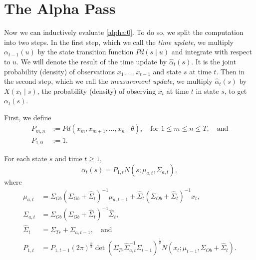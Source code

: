 \documentclass[12pt,leqno]{article}
\begin{document}
\section{The Alpha Pass}
  Now we can inductively evaluate \eqref{alpha:0}. To do so, we split the computation
  into two steps.  In the first step, which we call the {\em time update}, we multiply
  $\alpha_{t-1}(u)$ by the state transition function $Pd(s\mid u)$ and integrate with respect
  to $u$. We will denote the result of the time update by $\hat{\alpha}_t(s)$.  It is the joint probability
  (density) of observations $x_1,\dots,x_{t-1}$ and state $s$ at time $t$.
  Then in the second step, which we call the {\em measurement update}, we multiply
  $\hat{\alpha}_t(s)$ by $X(x_t \mid s)$, the probability (density) of observing $x_t$ at time $t$
  in state $s$, to get $\alpha_t(s)$.

  First, we define
\begin{align*}
  P_{m,n} &:= Pd(x_m,x_{m+1},\dots,x_n \mid \theta),\quad\text{for $1\le m \le n\le T$},\quad\text{and}\\
  P_{1,0} &:= 1.
\end{align*}
\begin{Thm}\label{alpha:1}
  For each state $s$ and time $t \ge 1$,
$$
  \alpha_t(s) = P_{1,t}N(s;\mu_{a,t},\Sigma_{a,t}),
$$
where
\begin{align*}
  \mu_{a,t} &= \Sigma_{Ob}(\Sigma_{Ob}+\widehat{\Sigma}_t)^{-1}\mu_{a,t-1}
  + \widehat{\Sigma}_t(\Sigma_{Ob}+\widehat{\Sigma}_t)^{-1}x_t, \\
  \Sigma_{a,t} &= \Sigma_{Ob}(\Sigma_{Ob}+\widehat{\Sigma}_t)^{-1}\widehat{\Sigma}_t,\\
  \widehat{\Sigma}_t &= \Sigma_{Tr}+\Sigma_{a,t-1},
 \quad\text{and}\\
  P_{1,t} &=P_{1,t-1}(2\pi)^{\frac{n}{2}}\det(\Sigma_{Tr}\widehat{\Sigma}_{a,t}^{-1}\Sigma_{t-1})^{\frac{1}{2}}
  N(x_t;\mu_{t-1},\Sigma_{Ob} + \widehat{\Sigma}_t).
\end{align*}
\end{Thm}
\end{document}

